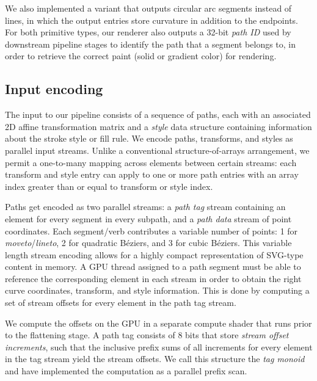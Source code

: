 \documentclass[sigconf, nonacm]{acmart}
\begin{document}
We also implemented a variant that outputs circular arc segments instead of lines, in which the output entries store curvature in addition to the endpoints. For both primitive types, our renderer also outputs a 32-bit \emph{path ID} used by downstream pipeline stages to identify the path that a segment belongs to, in order to retrieve the correct paint (solid or gradient color) for rendering.


\subsection{Input encoding}

The input to our pipeline consists of a sequence of paths, each with an associated 2D affine transformation matrix and a \emph{style} data structure containing information about the stroke style or fill rule. We encode paths, transforms, and styles as parallel input streams. Unlike a conventional structure-of-arrays arrangement, we permit a one-to-many mapping across elements between certain streams: each transform and style entry can apply to one or more path entries with an array index greater than or equal to transform or style index.

Paths get encoded as two parallel streams: a \emph{path tag} stream containing an element for every segment in every subpath, and a \emph{path data} stream of point coordinates. Each segment/verb contributes a variable number of points: 1 for \emph{moveto}/\emph{lineto}, 2 for quadratic Béziers, and 3 for cubic Béziers. This variable length stream encoding allows for a highly compact representation of SVG-type content in memory. A GPU thread assigned to a path segment must be able to reference the corresponding element in each stream in order to obtain the right curve coordinates, transform, and style information. This is done by computing a set of stream offsets for every element in the path tag stream.


We compute the offsets on the GPU in a separate compute shader that runs prior to the flattening stage. A path tag consists of 8 bits that store \emph{stream offset increments}, such that the inclusive prefix sums of all increments for every element in the tag stream yield the stream offsets. We call this structure the \emph{tag monoid} and have implemented the computation as a parallel prefix scan.
\end{document}
